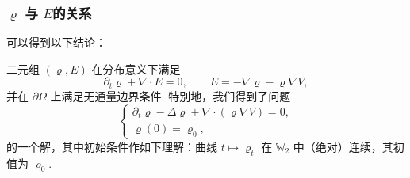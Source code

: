 \subsubsection*{\texorpdfstring{$\varrho$ 与 $E$}{密度与动量}的关系}
可以得到以下结论：
\begin{proposition}\label{obj:8.10}
二元组 $(\varrho,E)$ 在分布意义下满足
\[
\partial_t\varrho+\nabla\cdot E=0,\qquad E=-\nabla\varrho-\varrho\nabla V,
\]
并在 $\partial\Omega$ 上满足无通量边界条件. 特别地，我们得到了问题
\[
\begin{cases}
\partial_t\varrho-\Delta\varrho+\nabla\cdot(\varrho\nabla V)=0,\\
\varrho(0)=\varrho_0,
\end{cases}
\]
的一个解，其中初始条件作如下理解：曲线 $t\mapsto\varrho_t$ 在 $\mathbb W_2$ 中（绝对）连续，其初值为 $\varrho_0$.
\end{proposition}
